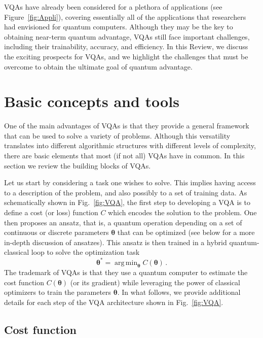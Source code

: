\documentclass[prx,twocolumn,floatfix,superscriptaddress,longbibliography]{revtex4-1}
\renewcommand{\vec}[1]{\boldsymbol{#1}}  %
\newcommand{\<}{\langle}
\renewcommand{\>}{\rangle}
\DeclareMathOperator*{\argmin}{arg\,min}
\renewcommand{\vec}[1]{\boldsymbol{#1}}  %
\begin{document}
VQAs have already been considered for a plethora of applications (see Figure~\ref{fig:Appli}), covering essentially all of the applications that researchers had envisioned for quantum computers. Although they may be the key to obtaining near-term quantum advantage, VQAs still face important challenges, including their trainability, accuracy, and efficiency. In this Review, we discuss the exciting prospects for VQAs, and we highlight the challenges that must be overcome to obtain the ultimate goal of quantum advantage. 




\section{Basic concepts and tools}\label{sec:2}



One of the main advantages of VQAs is that they provide a general framework that can be used to solve a variety of problems. Although this versatility translates into different algorithmic structures with different levels of complexity, there are basic elements that most (if not all) VQAs have in common. In this section we review the building blocks of VQAs.



Let us start by considering a task one wishes to solve. This implies having access to a description of the problem, and also possibly to a set of training data. As schematically shown in Fig.~\ref{fig:VQA}, the first step to developing a VQA is to define a cost (or loss) function $C$ which encodes the solution to the problem. One then proposes an ansatz, that is, a quantum operation depending on a set of continuous or discrete parameters  $\vec{\theta}$ that can be optimized (see below for a more in-depth discussion of ansatzes). This ansatz is then 
trained  in a hybrid quantum-classical loop to solve the optimization task 
\begin{equation}\label{eq:optimization}
   \vec{\theta}^*= \argmin_{\vec{\theta}} C(\vec{\theta})\,.
\end{equation}
The trademark of VQAs is that they use a quantum computer to estimate the cost function $C(\vec{\theta})$ (or its gradient) while leveraging the power of classical optimizers to train the parameters $\vec{\theta}$. In what follows, we provide additional details for each step of the VQA architecture shown in Fig.~\ref{fig:VQA}.



\subsection{ Cost function}\label{sec:Cost}
\end{document}
